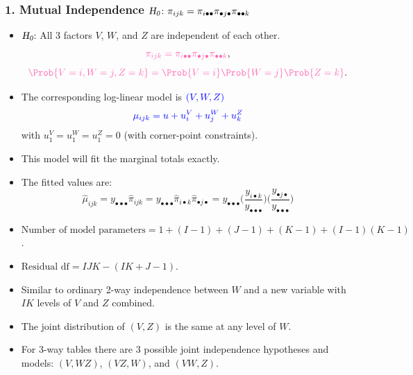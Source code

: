 \documentclass[oneside]{book}\usepackage[]{graphicx}\usepackage[svgnames]{xcolor}
\let\log\relax%
\newcommand{\HN}{\textsl{H}_{\textsl{0}}}%
\begin{document}
\subsubsection*{1. Mutual Independence $\HN\colon \pi_{ijk}=\pi_{i\bullet\bullet}\pi_{\bullet j\bullet}\pi_{\bullet\bullet k}$}
\begin{itemize}
    \item $ \HN $: All 3 factors $V$, $W$, and $Z$ are independent of each other.
          \[ \textcolor{HotPink}{\pi_{ijk}=\pi_{i\bullet\bullet}\pi_{\bullet j\bullet}\pi_{\bullet\bullet k}}, \]
          \[ \textcolor{HotPink}{\Prob{V=i,W=j,Z=k}=\Prob{V=i}\Prob{W=j}\Prob{Z=k}}. \]
    \item The corresponding log-linear model is $ \textcolor{Blue}{(V,W,Z)} $
          \[ \textcolor{Blue}{\log{\mu}_{ijk}=u+u_i^V+u_j^W+u_k^Z} \]
          with $ u_1^V=u_1^W=u_1^Z=0 $ (with corner-point constraints).
    \item This model will fit the marginal totals exactly.
    \item The fitted values are:
          \[ \hat{\mu}_{i j k
              }=y_{\bullet\bullet\bullet} \hat{\pi}_{ijk}
              =y_{\bullet\bullet\bullet} \hat{\pi}_{i\bullet k} \hat{\pi}_{\bullet j\bullet}
              =y_{\bullet\bullet\bullet}\biggl(\frac{y_{i\bullet k}}{y_{\bullet\bullet\bullet}}\biggr)
              \biggl(\frac{y_{\bullet j\bullet}}{y_{\bullet\bullet\bullet}}\biggr) \]
    \item $ \text{Number of model parameters}=1+(I-1)+(J-1)+(K-1)+(I-1)(K-1) $.
    \item $ \text{Residual df}=IJK-(IK+J-1) $.
    \item Similar to ordinary 2-way independence between $W$ and a new variable with $IK$
          levels of $V$ and $Z$ combined.
    \item The joint distribution of $(V,Z)$ is the same at any level of $W$.
    \item For 3-way tables there are 3 possible joint independence hypotheses and models:
          $(V,WZ)$, $(VZ,W)$, and $(VW,Z)$.
\end{itemize}
\end{document}
